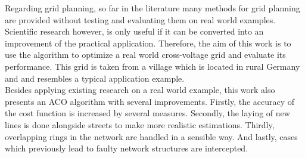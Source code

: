 Regarding grid planning, so far in the literature many methods for grid planning are provided without testing and evaluating them on real world examples. Scientific research however, is only useful if it can be converted into an improvement of the practical application. Therefore, the aim of this work is to use the algorithm to optimize a real world cross-voltage grid and evaluate its performance. This grid is taken from a village which is located in rural Germany and and resembles a typical application example.\\
Besides applying existing research on a real world example, this work also presents an ACO algorithm with several improvements. Firstly, the accuracy of the cost function is increased by several measures. Secondly, the laying of new lines is done alongside streets to make more realistic estimations. Thirdly, overlapping rings in the network are handled in a sensible way. And lastly, cases which previously lead to faulty network structures are intercepted.











